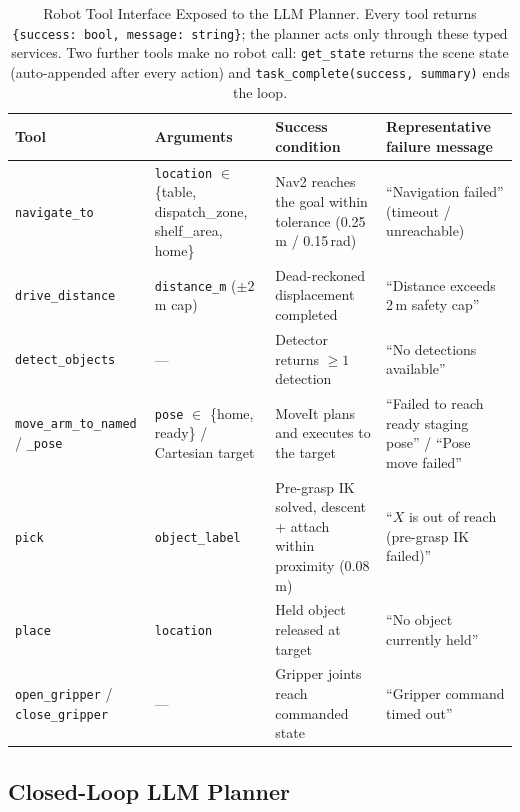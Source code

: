 \documentclass[conference]{IEEEtran}
\begin{document}
\begin{table}[t]
\caption{Robot Tool Interface Exposed to the LLM Planner. Every tool returns
\texttt{\{success:\,bool, message:\,string\}}; the planner acts only through
these typed services. Two further tools make no robot call:
\texttt{get\_state} returns the scene state (auto-appended after every
action) and \texttt{task\_complete(success, summary)} ends the loop.}
\label{tab:tools}
\centering
\scriptsize
\setlength{\tabcolsep}{4pt}
\begin{tabular}{@{}>{\raggedright\arraybackslash}p{3.4cm}>{\raggedright\arraybackslash}p{3.4cm}>{\raggedright\arraybackslash}p{4.6cm}>{\raggedright\arraybackslash}p{4.8cm}@{}}
\toprule
\textbf{Tool} & \textbf{Arguments} & \textbf{Success condition} & \textbf{Representative failure message} \\
\midrule
\texttt{navigate\_to} & \texttt{location} $\in$ \{table, dispatch\_zone, shelf\_area, home\} & Nav2 reaches the goal within tolerance (0.25\,m / 0.15\,rad) & ``Navigation failed'' (timeout / unreachable) \\
\texttt{drive\_distance} & \texttt{distance\_m} ($\pm2$\,m cap) & Dead-reckoned displacement completed & ``Distance exceeds 2\,m safety cap'' \\
\texttt{detect\_objects} & --- & Detector returns $\geq1$ detection & ``No detections available'' \\
\texttt{move\_arm\_to\_named} / \texttt{\_pose} & \texttt{pose} $\in$ \{home, ready\} / Cartesian target & MoveIt plans and executes to the target & ``Failed to reach ready staging pose'' / ``Pose move failed'' \\
\texttt{pick} & \texttt{object\_label} & Pre-grasp IK solved, descent + attach within proximity (0.08\,m) & ``$X$ is out of reach (pre-grasp IK failed)'' \\
\texttt{place} & \texttt{location} & Held object released at target & ``No object currently held'' \\
\texttt{open\_gripper} / \texttt{close\_gripper} & --- & Gripper joints reach commanded state & ``Gripper command timed out'' \\
\bottomrule
\end{tabular}
\end{table}

\subsection{Closed-Loop LLM Planner}
\end{document}
